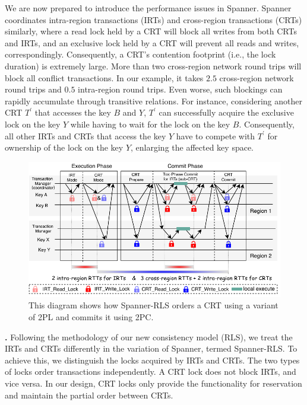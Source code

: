 We are now prepared to introduce the performance issues in Spanner. Spanner coordinates intra-region transactions (IRTs) and cross-region transactions (CRTs) similarly, where a read lock held by a CRT will block all writes from both CRTs and IRTs, and an exclusive lock held by a CRT will prevent all reads and writes, correspondingly. Consequently, a CRT's contention footprint (i.e., the lock duration) is extremely large. More than two cross-region network round trips will block all conflict transactions. In our example, it takes $2.5$ cross-region network round trips and $0.5$ intra-region round trips. Even worse, such blockings can rapidly accumulate through transitive relations. For instance, considering another CRT $T^{\prime}$ that accesses the key $B$ and $Y$, $T^{\prime}$ can successfully acquire the exclusive lock on the key $Y$ while having to wait for the lock on the key $B$. Consequently, all other IRTs and CRTs that access the key $Y$ have to compete with $T^{\prime}$ for ownership of the lock on the key $Y$, enlarging the affected key space.



\begin{figure}[t]  
    \centering
    \includegraphics[width=1\columnwidth]{figures/RLS-spanner.pdf}
    \caption{This diagram shows how Spanner-RLS orders a CRT using a variant of 2PL and commits it using 2PC.} \label{fig:spannerrls}
\end{figure}



\noindent\textbf{\spannerxx.} Following the methodology of our new consistency model (RLS), we treat the IRTs and CRTs differently in the variation of Spanner, termed Spanner-RLS. To achieve this, we distinguish the locks acquired by IRTs and CRTs. 
The two types of locks order transactions independently. A CRT lock does not block IRTs, and vice versa. In our design, CRT locks only provide the functionality for reservation and maintain the partial order between CRTs.


